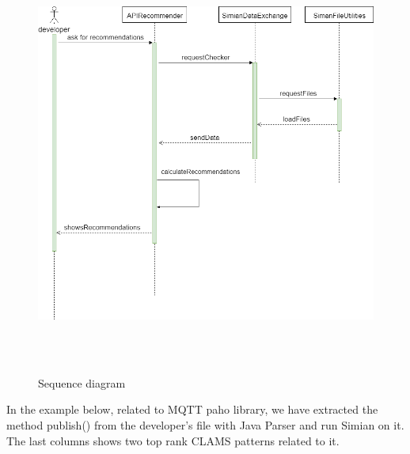 \begin{figure}[H]
\includegraphics[width=12cm,height=14cm,keepaspectratio]{images/Sequence.png}
\centering
\caption{Sequence diagram }
\label{fig:cmd}
\end{figure}


In the example below, related to MQTT paho library, we have extracted the method publish() from the developer's file with Java Parser and run Simian on it.  The last columns shows two top rank CLAMS patterns related to it.
\vspace{5mm}

